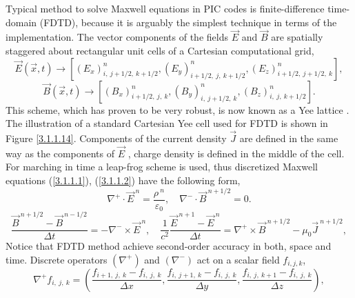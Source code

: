 Typical method to solve Maxwell equations in PIC codes is finite-difference time-domain (FDTD), because it is arguably the simplest technique in terms of the implementation. The vector components of the fields $ \vec{E} $ and $ \vec{B} $ are spatially staggered about rectangular unit cells of a Cartesian computational grid,
\begin{equation}
\label{3.1.1.4}
\vec{E}\left(\vec{x}, t \right) \rightarrow \left[\left(E_{x}\right)^{n}_{i,\: j + 1/2,\: k + 1/2}, \left(E_{y}\right)^{n}_{i + 1/2,\: j,\: k + 1/2}, \left(E_{z}\right)^{n}_{i + 1/2,\: j + 1/2,\: k} \right],
\end{equation}
\begin{equation}
\label{3.1.1.5}
\vec{B}\left(\vec{x}, t \right) \rightarrow \left[\left(B_{x}\right)^{n}_{i + 1/2,\: j,\: k}, \left(B_{y}\right)^{n}_{i,\: j + 1/2,\: k}, \left(B_{z}\right)^{n}_{i,\: j,\: k + 1/2} \right].
\end{equation}
This scheme, which has proven to be very robust, is now known as a Yee lattice \cite{yee}. The illustration of a standard Cartesian Yee cell used for FDTD is shown in Figure \ref{3.1.1.14}. Components of the current density $ \vec{J} $ are defined in the same way as the components of $ \vec{E} $ , charge density is defined in the middle of the cell. For marching in time a leap-frog scheme is used, thus discretized Maxwell equations (\ref{3.1.1.1}), (\ref{3.1.1.2}) have the following form,
\begin{equation}
\label{3.1.1.6}
\nabla^{+} \cdot \vec{E}^{\:n} = \frac{\rho^{\:n}}{\varepsilon_0}, \quad \nabla^{-} \cdot \vec{B}^{\:n + 1/2} = 0.
\end{equation}
\begin{equation}
\label{3.1.1.7}
\frac{\vec{B}^{\:n + 1/2} - \vec{B}^{\:n - 1/2}}{\Delta t} = -\nabla^{-} \times \vec{E}^{\:n}, \quad \frac{1}{c^{2}} \frac{\vec{E}^{\:n + 1} - \vec{E}^{\:n}}{\Delta t} = \nabla^{+} \times \vec{B}^{\:n + 1/2} - \mu_{0} \vec{J}^{\:n + 1/2},
\end{equation}
Notice that FDTD method achieve second-order accuracy in both, space and time. Discrete operators $ \left(\nabla^{+}\right) $ and $ \left(\nabla^{-}\right) $ act on a scalar field $ f_{i, j, k} $,
\begin{equation}
\label{3.1.1.8}
\nabla^{+} f_{i,\: j,\: k} = \left(\frac{f_{i + 1,\: j,\: k} - f_{i,\: j,\: k}}{\Delta x}, \frac{f_{i,\: j + 1,\: k} - f_{i,\: j,\: k}}{\Delta y}, \frac{f_{i,\: j,\: k + 1} - f_{i,\: j,\: k}}{\Delta z} \right), 
\end{equation}
